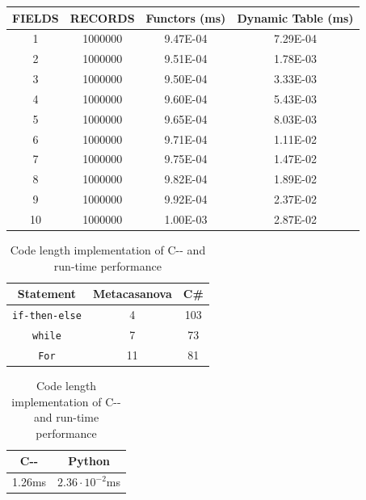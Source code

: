 \begin{table}
	\vspace{0.15cm}
	\begin{tabular}{|c|c|c|c|}
		\hline
		\textbf{FIELDS}& \textbf{RECORDS}& \textbf{Functors (ms)}&\textbf{Dynamic Table (ms)}\\ \hline
		1&	1000000&	9.47E-04&	7.29E-04\\ \hline
		2&	1000000&	9.51E-04&	1.78E-03\\ \hline
		3&	1000000&	9.50E-04&	3.33E-03\\ \hline
		4&	1000000&	9.60E-04&	5.43E-03\\ \hline
		5&	1000000&	9.65E-04&	8.03E-03\\ \hline
		6&	1000000&	9.71E-04&	1.11E-02\\ \hline
		7&	1000000&	9.75E-04&	1.47E-02\\ \hline
		8&	1000000&	9.82E-04&	1.89E-02\\ \hline
		9&	1000000&	9.92E-04&	2.37E-02\\ \hline
		10&	1000000&	1.00E-03&	2.87E-02\\ \hline					
	\end{tabular}
	\label{tab:functors}
\end{table}

\begin{table}
	\centering
	\caption{Code length implementation of C-{}- and run-time performance}
	\begin{tabular}{|c|c|c|}
		\hline
		\textbf{Statement} & \textbf{Metacasanova} & \textbf{C\#}\\
		\hline
		\texttt{if-then-else} & 4 & 103 \\
		\hline
		\texttt{while} & 7 & 73 \\
		\hline
		\texttt{For} & 11 & 81\\
		\hline
	\end{tabular}
	
	\vspace{0.15cm}
	\begin{tabular}{|c|c|}
		\hline
		\textbf{C-{}-} & \textbf{Python} \\
		\hline
		1.26ms & $2.36 \cdot 10^{-2}$ms \\
		\hline
	\end{tabular}
	\label{tab:cmm}
\end{table}

